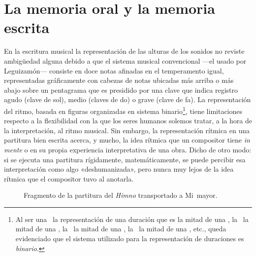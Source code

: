 \section{La memoria oral y la memoria escrita}
\label{sec:memoria-oral-escrita}

En la escritura musical la representación de las alturas de los sonidos no reviste ambigüedad alguna debido a que el sistema musical convencional ---el usado por Leguizamón--- consiste en doce notas afinadas en el temperamento igual, representadas gráficamente con cabezas de notas ubicadas más arriba o más abajo sobre un pentagrama que es presidido por una clave que indica registro agudo (clave de sol), medio (claves de do) o grave (clave de fa). La representación del ritmo, basada en figuras organizadas en sistema binario\footnote{Al ser una \blanca\ la representación de una duración que es la mitad de una \redonda, la \negra\ la mitad de una \blanca, la \corchea\ la mitad de una \negra, la \semicorchea\ la mitad de una \corchea, etc., queda evidenciado que el sistema utilizado para la representación de duraciones es \emph{binario}.}, tiene limitaciones respecto a la flexibilidad con la que los seres humanos solemos tratar, a la hora de la interpretación, al ritmo musical. Sin embargo, la representación rítmica en una partitura bien escrita acerca, y mucho, la idea rítmica que un compositor tiene \emph{in mente} o en su propia experiencia interpretativa de una obra. Dicho de otro modo: si se ejecuta una partitura rígidamente, matemáticamente, se puede percibir esa interpretación como algo «deshumanizada», pero nunca muy lejos de la idea rítmica que el compositor tuvo al anotarla.

\begin{figure}[htb]
\caption{Fragmento de la partitura del \emph{Himno} transportado a Mi\bemoltxt\ mayor.}
\label{fig:frag-partitura}
\end{figure}

